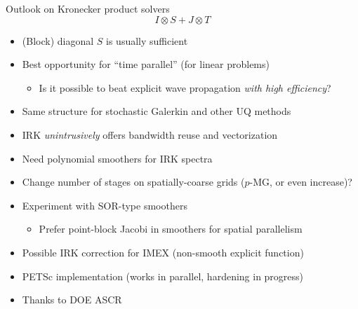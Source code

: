\documentclass{beamer}
\begin{document}
\begin{frame}{Outlook on Kronecker product solvers}
  $$ I \otimes S + J \otimes T $$
  \begin{itemize}
  \item (Block) diagonal $S$ is usually sufficient
  \item Best opportunity for ``time parallel'' (for linear problems)
    \begin{itemize}
    \item Is it possible to beat explicit wave propagation \emph{with high efficiency}?
    \end{itemize}
  \item Same structure for stochastic Galerkin and other UQ methods
  \item IRK \emph{unintrusively} offers bandwidth reuse and vectorization
  \item Need polynomial smoothers for IRK spectra
  \item Change number of stages on spatially-coarse grids ($p$-MG, or even increase)?
  \item Experiment with SOR-type smoothers
    \begin{itemize}
    \item Prefer point-block Jacobi in smoothers for spatial parallelism
    \end{itemize}
  \item Possible IRK correction for IMEX (non-smooth explicit function)
  \item PETSc implementation (works in parallel, hardening in progress)
  \item Thanks to DOE ASCR
  \end{itemize}
\end{frame}
\end{document}

